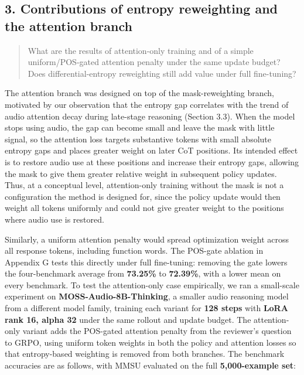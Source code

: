 \subsection*{3. Contributions of entropy reweighting and the attention branch}

\begin{quote}\small\color{ReviewQuote}
What are the results of attention-only training and of a simple uniform/POS-gated attention penalty under the same update budget? Does differential-entropy reweighting still add value under full fine-tuning?

\end{quote}

The attention branch was designed on top of the mask-reweighting branch, motivated by our observation that the entropy gap correlates with the trend of audio attention decay during late-stage reasoning (Section 3.3). When the model stops using audio, the gap can become small and leave the mask with little signal, so the attention loss targets substantive tokens with small absolute entropy gaps and places greater weight on later CoT positions. Its intended effect is to restore audio use at these positions and increase their entropy gaps, allowing the mask to give them greater relative weight in subsequent policy updates. Thus, at a conceptual level, attention-only training without the mask is not a configuration the method is designed for, since the policy update would then weight all tokens uniformly and could not give greater weight to the positions where audio use is restored.

Similarly, a uniform attention penalty would spread optimization weight across all response tokens, including function words. The POS-gate ablation in Appendix G tests this directly under full fine-tuning: removing the gate lowers the four-benchmark average from \textbf{73.25\%} to \textbf{72.39\%}, with a lower mean on every benchmark. To test the attention-only case empirically, we ran a small-scale experiment on \textbf{MOSS-Audio-8B-Thinking}, a smaller audio reasoning model from a different model family, training each variant for \textbf{128 steps} with \textbf{LoRA rank 16, alpha 32} under the same rollout and update budget. The attention-only variant adds the POS-gated attention penalty from the reviewer's question to GRPO, using uniform token weights in both the policy and attention losses so that entropy-based weighting is removed from both branches. The benchmark accuracies are as follows, with MMSU evaluated on the full \textbf{5,000-example set}:

